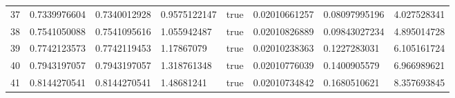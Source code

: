 \begin{tabular}{@{}llllllll@{}}
37 & 0.7339976604 & 0.7340012928 & 0.9575122147 & true & 0.02010661257 & 0.08097995196 & 4.027528341 \\
38 & 0.7541050088 & 0.7541095616 & 1.055942487 & true & 0.02010826889 & 0.09843027234 & 4.895014728 \\
39 & 0.7742123573 & 0.7742119453 & 1.17867079 & true & 0.02010238363 & 0.1227283031 & 6.105161724 \\
40 & 0.7943197057 & 0.7943197057 & 1.318761348 & true & 0.02010776039 & 0.1400905579 & 6.966989621 \\
41 & 0.8144270541 & 0.8144270541 & 1.48681241 & true & 0.02010734842 & 0.1680510621 & 8.357693845 \\
\bottomrule
\end{tabular}
